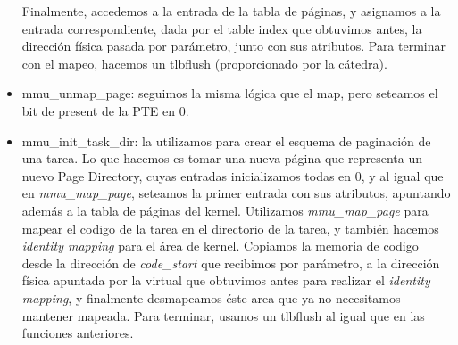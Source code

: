 \begin{itemize}
    Finalmente, accedemos a la entrada de la tabla de páginas, y asignamos a la entrada correspondiente, dada por el table index que obtuvimos
    antes, la dirección física pasada por parámetro, junto con sus atributos. Para terminar con el mapeo, hacemos un tlbflush (proporcionado por la cátedra).
    \item mmu_unmap_page: seguimos la misma lógica que el map, pero seteamos el bit de present de la PTE en 0.
    \item mmu_init_task_dir: la utilizamos para crear el esquema de paginación de una tarea. Lo que hacemos es tomar una nueva página que
    representa un nuevo Page Directory, cuyas entradas inicializamos todas en 0, y al igual que en \emph{mmu_map_page}, seteamos la primer entrada
    con sus atributos, apuntando además a la tabla de páginas del kernel. Utilizamos \emph{mmu_map_page} para mapear el codigo de la tarea en el directorio de la tarea,
    y también hacemos \emph{identity mapping} para el área de kernel. Copiamos la memoria de codigo desde la dirección de
    \emph{code_start} que recibimos por parámetro, a la dirección física apuntada por la virtual que obtuvimos antes para realizar el \emph{identity mapping}, y finalmente
    desmapeamos éste area que ya no necesitamos mantener mapeada. Para terminar, usamos un tlbflush al igual que en las funciones anteriores. 
\end{itemize}